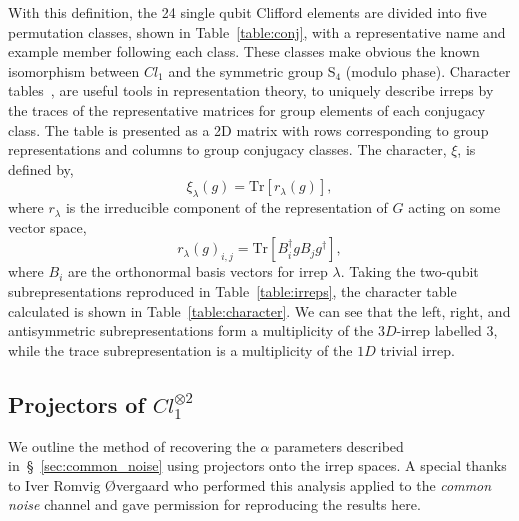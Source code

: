 With this definition, the 24 single qubit Clifford elements are divided into five permutation classes, shown in Table~\ref{table:conj}, with a representative name and example member following each class.
These classes make obvious the known isomorphism between $Cl_1$ and the symmetric group S$_4$ (modulo phase).
Character tables~\cite{lee_character_2025}, are useful tools in representation theory, to uniquely describe irreps 
by the traces of the representative matrices for group elements of each conjugacy class. The table is presented as a 2D matrix with rows corresponding to group representations and columns to group conjugacy classes. The character, $\xi$, is defined by,
\begin{equation}
\xi_\lambda(g) = \mathrm{Tr}[r_\lambda(g)],
\end{equation}
where $r_\lambda$ is the irreducible component of the representation of $G$ acting on some vector space,
\begin{equation}
r_\lambda(g)_{i,j} = \mathrm{Tr}[B_i^\dagger g B_j g^\dagger],
\end{equation}
where $B_i$ are the orthonormal basis vectors for irrep $\lambda$.
Taking the two-qubit subrepresentations reproduced in Table~\ref{table:irreps}, the character table calculated is shown in Table~\ref{table:character}. We can see that the left, right, and antisymmetric subrepresentations form a multiplicity of the $3D$-irrep labelled $3$, while the trace subrepresentation is a multiplicity of the $1D$ trivial irrep.


\subsection{Projectors of $Cl_1^{\otimes 2}$}
\label{sec:k-copy_projector}
We outline the method of recovering the $\alpha$ parameters described in~\S~\ref{sec:common_noise} using projectors onto the irrep spaces. A special thanks to Iver Romvig {\O}vergaard who performed this analysis applied to the \emph{common noise} channel and gave permission for reproducing the results here. 

